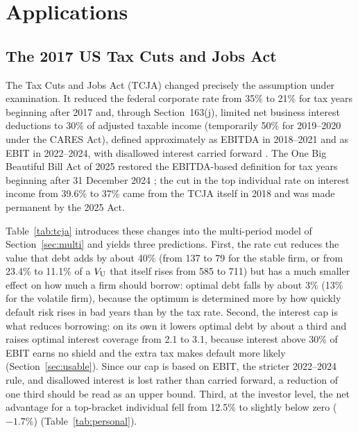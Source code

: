 \section{Applications}\label{sec:apps}

\subsection{The 2017 US Tax Cuts and Jobs Act}\label{sec:tcja}

The Tax Cuts and Jobs Act (TCJA) changed precisely the assumption under examination. It reduced the federal corporate rate from 35\% to 21\% for tax years beginning after 2017 and, through Section~163(j), limited net business interest deductions to 30\% of adjusted taxable income (temporarily 50\% for 2019--2020 under the CARES Act), defined approximately as EBITDA in 2018--2021 and as EBIT in 2022--2024, with disallowed interest carried forward \citep{gale2018,irs2025,irs2026}. The One Big Beautiful Bill Act of 2025 restored the EBITDA-based definition for tax years beginning after 31 December 2024 \citep{irs2026}; the cut in the top individual rate on interest income from 39.6\% to 37\% came from the TCJA itself in 2018 and was made permanent by the 2025 Act.

Table~\ref{tab:tcja} introduces these changes into the multi-period model of Section~\ref{sec:multi} and yields three predictions. First, the rate cut reduces the value that debt adds by about 40\% (from 137 to 79 for the stable firm, or from 23.4\% to 11.1\% of a $V_{\mathrm{U}}$ that itself rises from 585 to 711) but has a much smaller effect on how much a firm should borrow: optimal debt falls by about 3\% (13\% for the volatile firm), because the optimum is determined more by how quickly default risk rises in bad years than by the tax rate. Second, the interest cap is what reduces borrowing: on its own it lowers optimal debt by about a third and raises optimal interest coverage from 2.1 to 3.1, because interest above 30\% of EBIT earns no shield and the extra tax makes default more likely (Section~\ref{sec:usable}). Since our cap is based on EBIT, the stricter 2022--2024 rule, and disallowed interest is lost rather than carried forward, a reduction of one third should be read as an upper bound. Third, at the investor level, the net advantage for a top-bracket individual fell from 12.5\% to slightly below zero ($-1.7\%$) (Table~\ref{tab:personal}).

